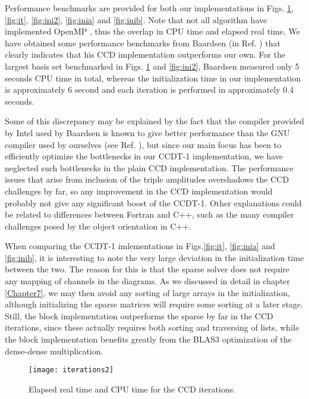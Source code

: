 Performance benchmarks are provided for both our implementations in Figs. \ref{fig:it2}, \ref{fig:it}, \ref{fig:ini2}, \ref{fig:inia} and \ref{fig:inib}. Note that not all algorithm have implemented OpenMP \cite{openmp}, thus the overlap in CPU time and elapsed real time. We have obtained some performance benchmarks from Baardsen (in Ref. \cite{Baardsen2015}) that clearly indicates that his CCD implementation outperforms our own. For the largest basis set benchmarked in Figs. \ref{fig:it2} and \ref{fig:ini2}, Baardsen measured only 5 seconds CPU time in total, whereas the initialization time in our implementation is approximately 6 second and each iteration is performed in approximately 0.4 seconds. 

Some of this discrepancy may be explained by the fact that the compiler provided by Intel used by Baardsen is known to give better performance than the GNU compiler used by ourselves (see Ref. \cite{abel_drift}), but since our main focus has been to efficiently optimize the bottlenecks in our CCDT-1 implementation, we have neglected such bottlenecks in the plain CCD implementation. The performance issues that arise from inclusion of the triple amplitudes overshadows the CCD challenges by far, so any improvement in the CCD implementation would probably not give any significant boost of the CCDT-1. Other explanations could be related to differences between Fortran and C++, such as the many compiler challenges posed by the object orientation in C++. 

When comparing the CCDT-1 imlementations in Figs.\ref{fig:it}, \ref{fig:inia} and \ref{fig:inib}, it is interesting to note the very large deviation in the initialization time between the two. The reason for this is that the sparse solver does not require any mapping of channels in the diagrams. As we discussed in detail in chapter \ref{Chapter7}, we may then avoid any sorting of large arrays in the initialization, although initializing the sparse matrices will require some sorting at a later stage. Still, the block implementation outperforms the sparse by far in the CCD iterations, since these actually requires both sorting and traversing of lists, while the block implementation benefits greatly from the BLAS3 optimization of the dense-dense multiplication.


\begin{figure}[!htb]
  \centering
  \texttt{[image: iterations2]}
  \caption{Elapsed real time and CPU time for the CCD iterations.}
\label{fig:it2}
\end{figure}

